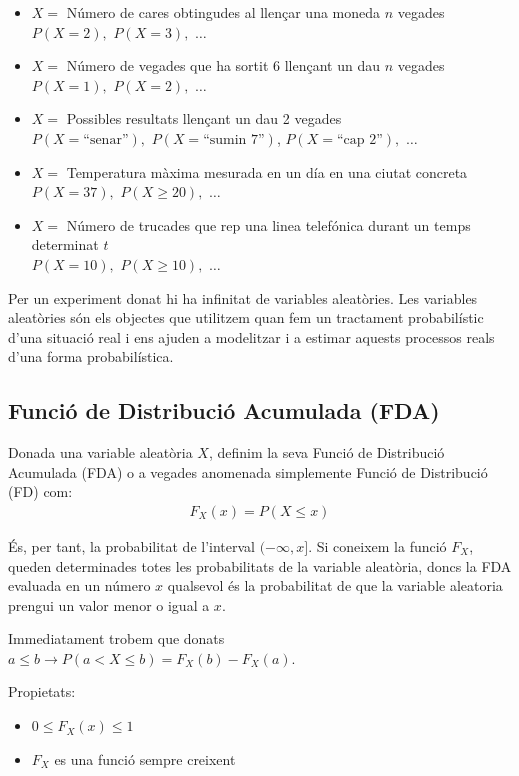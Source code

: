 \documentclass{article}
\begin{document}
\begin{itemize}
    \item $X=$ Número de cares obtingudes al llençar una moneda $n$ vegades \\
    $P(X=2),$ $P(X=3),$ $\ldots$
    \item $X=$ Número de vegades que ha sortit 6 llençant un dau $n$ vegades \\
    $P(X=1),$ $P(X=2),$ $\ldots$
    \item $X=$ Possibles resultats llençant un dau 2 vegades \\
    $P(X=\textrm{``senar''}),$ $P(X=\textrm{``sumin 7''})$, $P(X=\textrm{``cap 2''}),$ $\ldots$
    \item $X=$ Temperatura màxima mesurada en un día en una ciutat concreta \\
    $P(X=37),$ $P(X\geq20),$ $\ldots$
    \item $X=$ Número de trucades que rep una linea telefónica durant un temps determinat $t$\\
    $P(X=10),$ $P(X\geq10),$ $\ldots$
\end{itemize}

Per un experiment donat hi ha infinitat de variables aleatòries. Les variables aleatòries són els objectes que utilitzem quan fem un tractament probabilístic d’una situació real i ens ajuden a modelitzar i a estimar aquests processos reals d'una forma probabilística.

\subsection{Funció de Distribució Acumulada (FDA)}

Donada una variable aleatòria $X$, definim la seva Funció de Distribució Acumulada (FDA) o a vegades anomenada simplemente Funció de Distribució (FD) com:
\begin{align*}
F_X(x) = P(X\leq x)
\end{align*}

És, per tant, la probabilitat de l’interval $(-\infty, x]$. Si coneixem la funció $F_X$, queden determinades totes les probabilitats de la variable aleatòria, doncs la FDA evaluada en un número $x$ qualsevol és la probabilitat de que la variable aleatoria prengui un valor menor o igual a $x$.

Immediatament trobem que donats $a \leq b \rightarrow P(a < X \leq b) = F_X(b) - F_X(a)$.

Propietats:

\begin{itemize}
    \item $0 \leq F_X(x) \leq 1$
    \item $F_X$ es una funció sempre creixent
\end{itemize}
\end{document}
